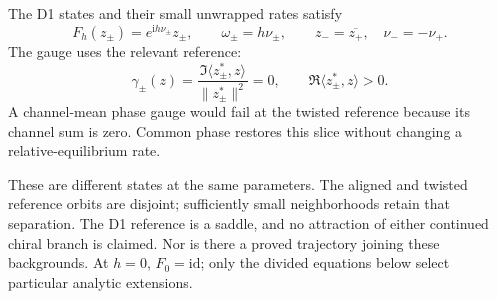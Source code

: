 \documentclass[11pt,a4paper]{article}
\numberwithin{equation}{section}
\theoremstyle{remark}\newtheorem{remark}[theorem]{Remark}
\newcommand{\iu}{\mathrm i}\newcommand{\Id}{I}\newcommand{\Argz}{\operatorname{Arg}_0}
\begin{document}
The D1 states and their small unwrapped rates satisfy
\begin{equation}
F_h(z_\pm)=e^{\iu h\nu_\pm}z_\pm,
\qquad \omega_\pm=h\nu_\pm,
\qquad z_- =\overline{z_+},\quad \nu_-=-\nu_+.
\label{eq:relative}
\end{equation}
The gauge uses the relevant reference:
\begin{equation}
\gamma_\pm(z)=\frac{\Im\langle z^*_\pm,z\rangle}{\|z^*_\pm\|^2}=0,
\qquad \Re\langle z^*_\pm,z\rangle>0.
\label{eq:gauge}
\end{equation}
A channel-mean phase gauge would fail at the twisted reference because its channel sum is zero. Common phase restores this slice without changing a relative-equilibrium rate.

These are different states at the same parameters. The aligned and twisted reference orbits are disjoint; sufficiently small neighborhoods retain that separation. The D1 reference is a saddle, and no attraction of either continued chiral branch is claimed. Nor is there a proved trajectory joining these backgrounds. At $h=0$, $F_0=\mathrm{id}$; only the divided equations below select particular analytic extensions.

\clearpage
\end{document}
